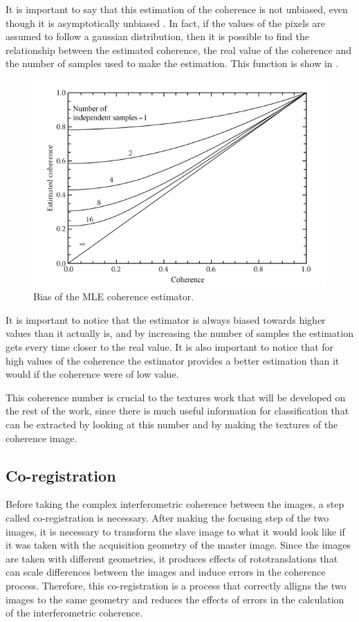 It is important to say that this estimation of the coherence is not unbiased, even though it is asymptotically unbiased \cite{Bamler}. In fact, if the values of the pixels are assumed to follow a gaussian distribution, then it is possible to find the relationship between the estimated coherence, the real value of the coherence and the number of samples used to make the estimation. This function is show in .

\begin{figure}[H]
    \centering
    \includegraphics[width=\linewidth]{Cap1/bias.png}
    \caption{Bias of the MLE coherence estimator. \cite{Bamler}}
    \label{fig:bias}
\end{figure}

It is important to notice that the estimator is always biased towards higher values than it actually is, and by increasing the number of samples the estimation gets every time closer to the real value. It is also important to notice that for high values of the coherence the estimator provides a better estimation than it would if the coherence were of low value. 

This coherence number is crucial to the textures work that will be developed on the rest of the work, since there is much useful information for classification that can be extracted by looking at this number and by making the textures of the coherence image.

\subsection{Co-registration}
Before taking the complex interferometric coherence between the images, a step called co-registration is necessary. After making the focusing step of the two images, it is necessary to transform the slave image to what it would look like if it was taken with the acquisition geometry of the master image. Since the images are taken with different geometries, it produces effects of rototranslations that can scale differences between the images and induce errors in the coherence process. Therefore, this co-registration is a process that correctly alligns the two images to the same geometry and reduces the effects of errors in the calculation of the interferometric coherence\cite{Andreathesis}.

